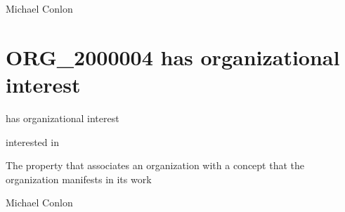 \documentclass[letterpaper,10pt,english]{sphinxmanual}
\begin{document}
\begin{sphinxShadowBox}

\sphinxAtStartPar
{}
\end{sphinxShadowBox}

\begin{sphinxShadowBox}

\sphinxAtStartPar
Michael Conlon 
\end{sphinxShadowBox}
\begin{quote}
\label{\detokenize{doc-ORG_2000004:org-2000004}}\label{\detokenize{doc-ORG_2000004:has-organizational-interest}}\label{\detokenize{doc-ORG_2000004:org-2000004}}
\ignorespaces \end{quote}


\section{ORG\_2000004 \sphinxhyphen{} has organizational interest}
\label{\detokenize{doc-ORG_2000004:org-2000004-has-organizational-interest}}\label{\detokenize{doc-ORG_2000004:index-0}}\label{\detokenize{doc-ORG_2000004::doc}}
\begin{sphinxShadowBox}

\sphinxAtStartPar
has organizational interest
\end{sphinxShadowBox}

\begin{sphinxShadowBox}

\sphinxAtStartPar
interested in
\end{sphinxShadowBox}

\begin{sphinxShadowBox}

\sphinxAtStartPar
The property that associates an organization with a concept that the organization manifests in its work
\end{sphinxShadowBox}

\begin{sphinxShadowBox}

\sphinxAtStartPar
Michael Conlon 
\end{sphinxShadowBox}
\end{document}

